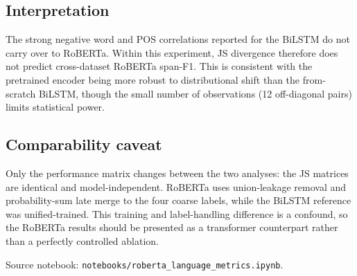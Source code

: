 \subsection*{Interpretation}

The strong negative word and POS correlations reported for the BiLSTM do not carry over to RoBERTa. Within this experiment, JS divergence therefore does not predict cross-dataset RoBERTa span-F1. This is consistent with the pretrained encoder being more robust to distributional shift than the from-scratch BiLSTM, though the small number of observations (12 off-diagonal pairs) limits statistical power.

\subsection*{Comparability caveat}

Only the performance matrix changes between the two analyses: the JS matrices are identical and model-independent. RoBERTa uses union-leakage removal and probability-sum late merge to the four coarse labels, while the BiLSTM reference was unified-trained. This training and label-handling difference is a confound, so the RoBERTa results should be presented as a transformer counterpart rather than a perfectly controlled ablation.

Source notebook: \texttt{notebooks/roberta\_language\_metrics.ipynb}.
